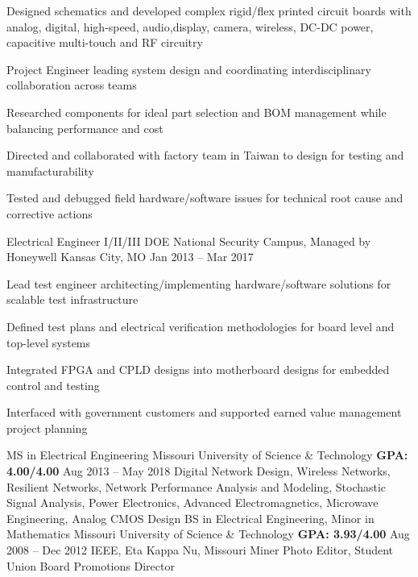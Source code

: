 \documentclass[]{awesome-cv}
\begin{document}
\begin{cventries}
{\begin{cvitems}
		\item {Designed schematics and developed complex rigid/flex printed circuit boards with analog, digital, high-speed, audio,\hfill \break  display, camera, wireless, DC-DC power, capacitive multi-touch and RF circuitry}
		\item {Project Engineer leading system design and coordinating interdisciplinary collaboration across teams}
		\item {Researched components for ideal part selection and BOM management while balancing performance and cost}
		\item {Directed and collaborated with factory team in Taiwan to design for testing and manufacturability}
		\item {Tested and debugged field hardware/software issues for technical root cause and corrective actions}
		\end{cvitems}}
\end{cventries}

\newpage

\begin{cventries}
	\cventry
	{Electrical Engineer I/II/III}
	{DOE National Security Campus, Managed by Honeywell}
	{Kansas City, MO}
	{Jan 2013 – Mar 2017}
	{\begin{cvitems}
		\item {Lead test engineer architecting/implementing hardware/software solutions for scalable test infrastructure}
		\item {Defined test plans and electrical verification methodologies for board level and top-level systems}
		\item {Integrated FPGA and CPLD designs into motherboard designs for embedded control and testing}
		\item {Interfaced with government customers and supported earned value management project planning}
		\end{cvitems}}
\end{cventries}

\begin{cventries}
	\cventry
	{MS in Electrical Engineering}
	{Missouri University of Science \& Technology}
	{\bfseries GPA: 4.00/4.00}
	{Aug 2013 – May 2018}
	{Digital Network Design, Wireless Networks, Resilient Networks, Network Performance Analysis and Modeling, \newline Stochastic Signal Analysis, Power Electronics, Advanced Electromagnetics, Microwave Engineering, Analog CMOS Design}
	\cventry
	{BS in Electrical Engineering, Minor in Mathematics}
	{Missouri University of Science \& Technology}
	{\bfseries GPA: 3.93/4.00}
	{Aug 2008 – Dec 2012}
	{IEEE, Eta Kappa Nu, Missouri Miner Photo Editor, Student Union Board Promotions Director} %
\end{cventries}
\end{document}
